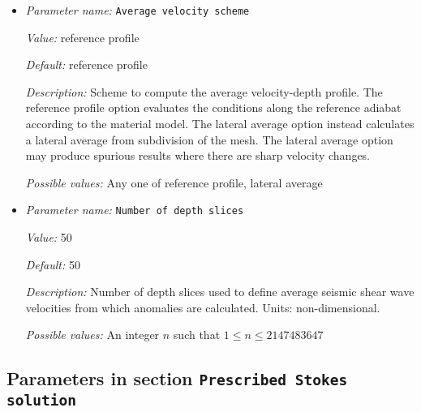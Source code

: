 \begin{itemize}
\item {\it Parameter name:} {\tt Average velocity scheme}
\label{parameters:Postprocess/Visualization/Vs anomaly/Average velocity scheme}


{\it Value:} reference profile


{\it Default:} reference profile


{\it Description:} Scheme to compute the average velocity-depth profile. The reference profile option evaluates the conditions along the reference adiabat according to the material model. The lateral average option instead calculates a lateral average from subdivision of the mesh. The lateral average option may produce spurious results where there are sharp velocity changes.


{\it Possible values:} Any one of reference profile, lateral average
\item {\it Parameter name:} {\tt Number of depth slices}
\label{parameters:Postprocess/Visualization/Vs anomaly/Number of depth slices}


{\it Value:} 50


{\it Default:} 50


{\it Description:} Number of depth slices used to define average seismic shear wave velocities from which anomalies are calculated. Units: non-dimensional.


{\it Possible values:} An integer $n$ such that $1\leq n \leq 2147483647$
\end{itemize}

\subsection{Parameters in section \tt Prescribed Stokes solution}
\label{parameters:Prescribed_20Stokes_20solution}

